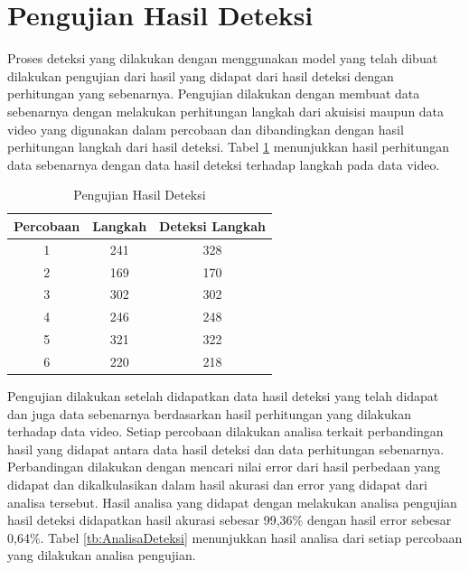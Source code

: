 \section{Pengujian Hasil Deteksi}
\label{sec:PengujianDeteksi}

Proses deteksi yang dilakukan dengan menggunakan model yang telah dibuat dilakukan pengujian dari hasil yang didapat dari hasil deteksi dengan perhitungan yang sebenarnya. Pengujian dilakukan dengan membuat data sebenarnya dengan melakukan perhitungan langkah dari akuisisi maupun data video yang digunakan dalam percobaan dan dibandingkan dengan hasil perhitungan langkah dari hasil deteksi. Tabel \ref{tb:PengujianDeteksi} menunjukkan hasil perhitungan data sebenarnya dengan data hasil deteksi terhadap langkah pada data video. 

\begin{longtable}{|c|c|c|}
  \caption{Pengujian Hasil Deteksi}
  \label{tb:PengujianDeteksi}                                   \\
  \hline
  \rowcolor[HTML]{C0C0C0}
  \textbf{Percobaan} & \textbf{Langkah} & \textbf{Deteksi Langkah} \\
  \hline
  1   & 241   & 328    \\
  \hline
  2   & 169   & 170    \\
  \hline
  3   & 302   & 302    \\
  \hline
  4   & 246   & 248    \\
  \hline
  5   & 321   & 322    \\
  \hline
  6   & 220   & 218    \\
  \hline
\end{longtable}

Pengujian dilakukan setelah didapatkan data hasil deteksi yang telah didapat dan juga data sebenarnya berdasarkan hasil perhitungan yang dilakukan terhadap data video. Setiap percobaan dilakukan analisa terkait perbandingan hasil yang didapat antara data hasil deteksi dan data perhitungan sebenarnya. Perbandingan dilakukan dengan mencari nilai error dari hasil perbedaan yang didapat dan dikalkulasikan dalam hasil akurasi dan error yang didapat dari analisa tersebut. Hasil analisa yang didapat dengan melakukan analisa pengujian hasil deteksi didapatkan hasil akurasi sebesar 99,36\% dengan hasil error sebesar 0,64\%. Tabel \ref{tb:AnalisaDeteksi} menunjukkan hasil analisa dari setiap percobaan yang dilakukan analisa pengujian.

